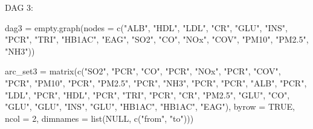 \documentclass[
  11pt,
  a4paper,
]{article}
\newenvironment{Shaded}{\begin{snugshade}}{\end{snugshade}}
\newcommand{\AttributeTok}[1]{\textcolor[rgb]{0.40,0.45,0.13}{#1}}
\newcommand{\ConstantTok}[1]{\textcolor[rgb]{0.56,0.35,0.01}{#1}}
\newcommand{\DecValTok}[1]{\textcolor[rgb]{0.68,0.00,0.00}{#1}}
\newcommand{\FunctionTok}[1]{\textcolor[rgb]{0.28,0.35,0.67}{#1}}
\newcommand{\NormalTok}[1]{\textcolor[rgb]{0.00,0.23,0.31}{#1}}
\newcommand{\OtherTok}[1]{\textcolor[rgb]{0.00,0.23,0.31}{#1}}
\newcommand{\StringTok}[1]{\textcolor[rgb]{0.13,0.47,0.30}{#1}}
\begin{document}
DAG 3:

\begin{Shaded}
\begin{Highlighting}[numbers=left,,]
\NormalTok{dag3 }\OtherTok{=} \FunctionTok{empty.graph}\NormalTok{(}\AttributeTok{nodes =} \FunctionTok{c}\NormalTok{(}\StringTok{"ALB"}\NormalTok{, }\StringTok{"HDL"}\NormalTok{, }\StringTok{"LDL"}\NormalTok{, }\StringTok{"CR"}\NormalTok{, }\StringTok{"GLU"}\NormalTok{,                                  }\StringTok{"INS"}\NormalTok{, }\StringTok{"PCR"}\NormalTok{, }\StringTok{"TRI"}\NormalTok{, }\StringTok{"HB1AC"}\NormalTok{, }
                             \StringTok{"EAG"}\NormalTok{, }\StringTok{"SO2"}\NormalTok{, }\StringTok{"CO"}\NormalTok{, }\StringTok{"NOx"}\NormalTok{, }\StringTok{"COV"}\NormalTok{,                                  }\StringTok{"PM10"}\NormalTok{, }\StringTok{"PM2.5"}\NormalTok{, }\StringTok{"NH3"}\NormalTok{))}
\end{Highlighting}
\end{Shaded}

\begin{Shaded}
\begin{Highlighting}[numbers=left,,]
\NormalTok{arc\_set3 }\OtherTok{=} \FunctionTok{matrix}\NormalTok{(}\FunctionTok{c}\NormalTok{(}\StringTok{"SO2"}\NormalTok{, }\StringTok{"PCR"}\NormalTok{,}
                    \StringTok{"CO"}\NormalTok{, }\StringTok{"PCR"}\NormalTok{,}
                    \StringTok{"NOx"}\NormalTok{, }\StringTok{"PCR"}\NormalTok{,}
                    \StringTok{"COV"}\NormalTok{, }\StringTok{"PCR"}\NormalTok{,}
                    \StringTok{"PM10"}\NormalTok{, }\StringTok{"PCR"}\NormalTok{,}
                    \StringTok{"PM2.5"}\NormalTok{, }\StringTok{"PCR"}\NormalTok{,}
                    \StringTok{"NH3"}\NormalTok{, }\StringTok{"PCR"}\NormalTok{,}
                    \StringTok{"PCR"}\NormalTok{, }\StringTok{"ALB"}\NormalTok{,}
                    \StringTok{"PCR"}\NormalTok{, }\StringTok{"LDL"}\NormalTok{,}
                    \StringTok{"PCR"}\NormalTok{, }\StringTok{"HDL"}\NormalTok{,}
                    \StringTok{"PCR"}\NormalTok{, }\StringTok{"TRI"}\NormalTok{,}
                    \StringTok{"PCR"}\NormalTok{, }\StringTok{"CR"}\NormalTok{,}
                    \StringTok{"PM2.5"}\NormalTok{, }\StringTok{"GLU"}\NormalTok{,}
                    \StringTok{"CO"}\NormalTok{, }\StringTok{"GLU"}\NormalTok{,}
                    \StringTok{"GLU"}\NormalTok{, }\StringTok{"INS"}\NormalTok{,}
                    \StringTok{"GLU"}\NormalTok{, }\StringTok{"HB1AC"}\NormalTok{,}
                    \StringTok{"HB1AC"}\NormalTok{, }\StringTok{"EAG"}\NormalTok{), }\AttributeTok{byrow =} \ConstantTok{TRUE}\NormalTok{, }\AttributeTok{ncol =} \DecValTok{2}\NormalTok{,}
                  \AttributeTok{dimnames =} \FunctionTok{list}\NormalTok{(}\ConstantTok{NULL}\NormalTok{, }\FunctionTok{c}\NormalTok{(}\StringTok{"from"}\NormalTok{, }\StringTok{"to"}\NormalTok{)))}
\end{Highlighting}
\end{Shaded}
\end{document}
